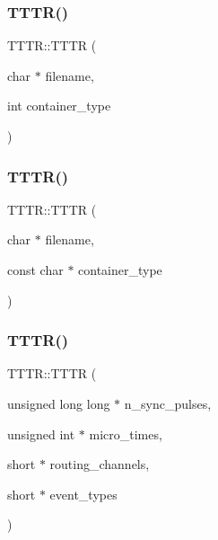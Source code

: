 \mbox{\label{class_t_t_t_r_acb25daf91a93eb600520c211d739f829}} 
\subsubsection{\texorpdfstring{T\+T\+T\+R()}{TTTR()}\hspace{0.1cm}{\footnotesize\ttfamily [3/6]}}
{\footnotesize\ttfamily T\+T\+T\+R\+::\+T\+T\+TR (\begin{DoxyParamCaption}\item[{char $\ast$}]{filename,  }\item[{int}]{container\+\_\+type }\end{DoxyParamCaption})}

\mbox{\label{class_t_t_t_r_a5ebe9e8b44de5824c4a21e0d78497aba}} 
\subsubsection{\texorpdfstring{T\+T\+T\+R()}{TTTR()}\hspace{0.1cm}{\footnotesize\ttfamily [4/6]}}
{\footnotesize\ttfamily T\+T\+T\+R\+::\+T\+T\+TR (\begin{DoxyParamCaption}\item[{char $\ast$}]{filename,  }\item[{const char $\ast$}]{container\+\_\+type }\end{DoxyParamCaption})}

\mbox{\label{class_t_t_t_r_aac095c4c7b20a7f682b1b487c9bf9bcd}} 
\subsubsection{\texorpdfstring{T\+T\+T\+R()}{TTTR()}\hspace{0.1cm}{\footnotesize\ttfamily [5/6]}}
{\footnotesize\ttfamily T\+T\+T\+R\+::\+T\+T\+TR (\begin{DoxyParamCaption}\item[{unsigned long long $\ast$}]{n\+\_\+sync\+\_\+pulses,  }\item[{unsigned int $\ast$}]{micro\+\_\+times,  }\item[{short $\ast$}]{routing\+\_\+channels,  }\item[{short $\ast$}]{event\+\_\+types }\end{DoxyParamCaption})}

